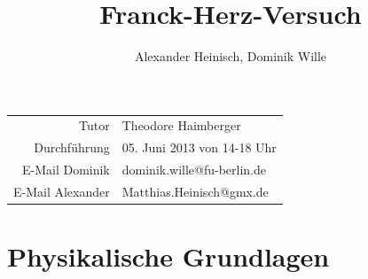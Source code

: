 \documentclass{article}
\title{Franck-Herz-Versuch}
\author{Alexander Heinisch, Dominik Wille}
\begin{document}
\maketitle

\begin{center}
\begin{minipage}{\linewidth}
\centering
{}
\label{wtd}
\end{minipage}
\end{center}

\vspace{7cm}
\noindent
\begin{center}
\begin{tabular}{r l}
Tutor & Theodore Haimberger\\
Durchführung & 05. Juni 2013 von 14-18 Uhr \\

E-Mail Dominik & dominik.wille@fu-berlin.de \\
E-Mail Alexander & Matthias.Heinisch@gmx.de \\
\end{tabular}
\end{center}

\newpage
\tableofcontents
\newpage

\section{Physikalische Grundlagen}
\end{document}
